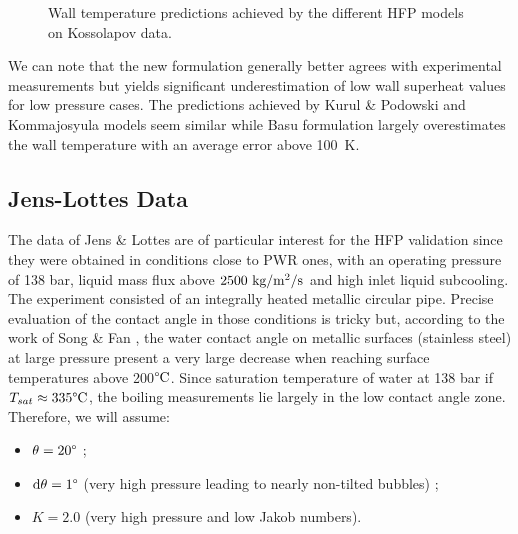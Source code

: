 \begin{figure}[!h]
{}

\caption{Wall temperature predictions achieved by the different HFP models on Kossolapov data.}
\label{fig:HFP_koss}
\end{figure}

\npar
We can note that the new formulation generally better agrees with experimental measurements but yields significant underestimation of low wall superheat values for low pressure cases. The predictions achieved by Kurul \& Podowski and Kommajosyula models seem similar while Basu \etal formulation largely overestimates the wall temperature with an average error above 100~K. 




\subsection{Jens-Lottes Data}
\label{subsec:HFP_verif_Jens}

The data of Jens \& Lottes are of particular interest for the HFP validation since they were obtained in conditions close to PWR ones, with an operating pressure of 138 bar, liquid mass flux above $2500\ \text{kg/m$^{2}$/s}$ and high inlet liquid subcooling. The experiment consisted of an integrally heated metallic circular pipe. Precise evaluation of the contact angle in those conditions is tricky but, according to the work of Song \& Fan \cite{song_temperature_2021}, the water contact angle on metallic surfaces (\eg stainless steel) at large pressure present a very large decrease when reaching surface temperatures above 200$\degree\mathrm{C}$. Since saturation temperature of water at 138 bar if $T_{sat} \approx 335 \degree\mathrm{C}$, the boiling measurements lie largely in the low contact angle zone. Therefore, we will assume:

\begin{itemize}
\item $\theta = 20 \degree$ ;
\item $\mathrm{d}\theta = 1 \degree$ (very high pressure leading to nearly non-tilted bubbles) ;
\item $K = 2.0$ (very high pressure and low Jakob numbers).
\end{itemize}


